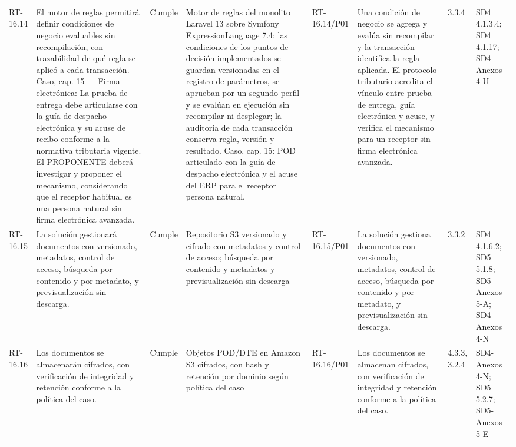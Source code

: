 \documentclass[oficio,firma,final]{lafrox}
\begin{document}
\begin{landscape}
{\begin{longtable}{@{}F{0.054} F{0.173} F{0.061} F{0.191} F{0.106} F{0.180} F{0.067} F{0.168}@{}}
  RT-16.14 & El motor de reglas permitirá definir condiciones de negocio evaluables sin recompilación, con trazabilidad de qué regla se aplicó a cada transacción. Caso, cap. 15 — Firma electrónica: La prueba de entrega debe articularse con la guía de despacho electrónica y su acuse de recibo conforme a la normativa tributaria vigente. El PROPONENTE deberá investigar y proponer el mecanismo, considerando que el receptor habitual es una persona natural sin firma electrónica avanzada. & Cumple & Motor de reglas del monolito Laravel 13 sobre Symfony ExpressionLanguage 7.4: las condiciones de los puntos de decisión implementados se guardan versionadas en el registro de parámetros, se aprueban por un segundo perfil y se evalúan en ejecución sin recompilar ni desplegar; la auditoría de cada transacción conserva regla, versión y resultado. Caso, cap. 15: POD articulado con la guía de despacho electrónica y el acuse del ERP para el receptor persona natural. & RT-16.14/\allowbreak{}P01 & Una condición de negocio se agrega y evalúa sin recompilar y la transacción identifica la regla aplicada. El protocolo tributario acredita el vínculo entre prueba de entrega, guía electrónica y acuse, y verifica el mecanismo para un receptor sin firma electrónica avanzada. & 3.3.4 & SD4 4.1.3.4; SD4 4.1.17; SD4-Anexos 4-U  \\
  RT-16.15 & La solución gestionará documentos con versionado, metadatos, control de acceso, búsqueda por contenido y por metadato, y previsualización sin descarga. & Cumple & Repositorio S3 versionado y cifrado con metadatos y control de acceso; búsqueda por contenido y metadatos y previsualización sin descarga & RT-16.15/\allowbreak{}P01 & La solución gestiona documentos con versionado, metadatos, control de acceso, búsqueda por contenido y por metadato, y previsualización sin descarga. & 3.3.2 & SD4 4.1.6.2; SD5 5.1.8; SD5-Anexos 5-A; SD4-Anexos 4-N  \\
  RT-16.16 & Los documentos se almacenarán cifrados, con verificación de integridad y retención conforme a la política del caso. & Cumple & Objetos POD/DTE en Amazon S3 cifrados, con hash y retención por dominio según política del caso & RT-16.16/\allowbreak{}P01 & Los documentos se almacenan cifrados, con verificación de integridad y retención conforme a la política del caso. & 4.3.3, 3.2.4 & SD4-Anexos 4-N; SD5 5.2.7; SD5-Anexos 5-E  \\

\end{longtable}}
\end{landscape}
\end{document}
